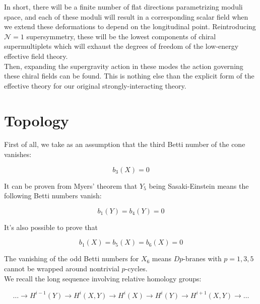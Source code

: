 In short, there will be a finite number of flat directions parametrizing moduli space, and each of these moduli will result in a corresponding scalar field when we extend these deformations to depend on the longitudinal point. Reintroducing $\mathcal{N}=1$ supersymmetry, these will be the lowest components of chiral supermultiplets which will exhaust the degrees of freedom of the low-energy effective field theory.\\

Then, expanding the supergravity action in these modes the action governing these chiral fields can be found. This is nothing else than the explicit form of the effective theory for our original strongly-interacting theory.




\section{Topology }


First of all, we take as an assumption that the third Betti number of the cone vanishes:

\begin{equation}
	b_3(X) = 0 \label{bettiX3}
\end{equation}

It can be proven from Myers' theorem that $Y_5$ being Sasaki-Einstein means the following Betti numbers vanish:

\begin{equation}
	b_1(Y) = b_4(Y) = 0 \label{bettiY14}
\end{equation}

It's also possible to prove that

\begin{equation}
	b_1(X) = b_5(X) = b_6(X) = 0
\end{equation}

The vanishing of the odd Betti numbers for $X_6$ means $Dp$-branes with $p = 1,3,5$ cannot be wrapped around nontrivial $p$-cycles.\\

We recall the long sequence involving relative homology groups:

\begin{equation}
	\ldots \rightarrow H^{i-1}(Y) \rightarrow H^{i}(X,Y) \rightarrow H^i(X) \rightarrow H^i(Y) \rightarrow H^{i+1}(X,Y) \rightarrow \ldots
\end{equation}

